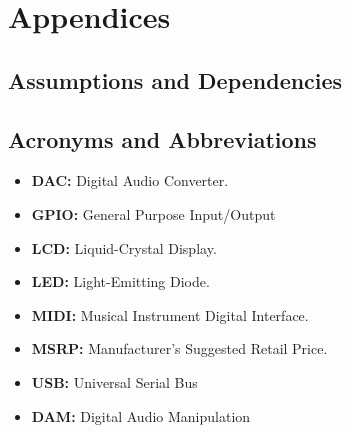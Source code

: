 \section{Appendices}

\subsection{Assumptions and Dependencies}
\subsection{Acronyms and Abbreviations}
    \begin{itemize}
        \item \label{DAC} \textbf{DAC:} Digital Audio Converter.
        \item \label{GPIO} \textbf{GPIO:} General Purpose Input/Output
        \item \label{LCD} \textbf{LCD:} Liquid-Crystal Display.
        \item \label{LED} \textbf{LED:} Light-Emitting Diode.
        \item \label{MIDI} \textbf{MIDI:} Musical Instrument Digital Interface.
        \item \label{MSRP} \textbf{MSRP:} Manufacturer's Suggested Retail Price.
        \item \label{USB} \textbf{USB:} Universal Serial Bus
        \item \label{DAM} \textbf{DAM:} Digital Audio Manipulation
    \end{itemize}